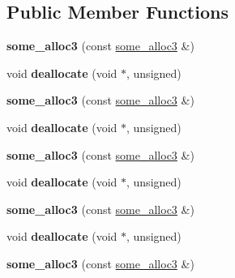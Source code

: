 \subsection*{Public Member Functions}
\begin{DoxyCompactItemize}
\item 
\mbox{\label{structsome__alloc3_ad7395261d1d33a5af7e39428dbc2ada4}} 
{\bfseries some\+\_\+alloc3} (const \mbox{\hyperlink{structsome__alloc3}{some\+\_\+alloc3}} \&)
\item 
\mbox{\label{structsome__alloc3_a3f290ec2c0726b083de71cfb848fc8e3}} 
void {\bfseries deallocate} (void $\ast$, unsigned)
\item 
\mbox{\label{structsome__alloc3_ad7395261d1d33a5af7e39428dbc2ada4}} 
{\bfseries some\+\_\+alloc3} (const \mbox{\hyperlink{structsome__alloc3}{some\+\_\+alloc3}} \&)
\item 
\mbox{\label{structsome__alloc3_a3f290ec2c0726b083de71cfb848fc8e3}} 
void {\bfseries deallocate} (void $\ast$, unsigned)
\item 
\mbox{\label{structsome__alloc3_ad7395261d1d33a5af7e39428dbc2ada4}} 
{\bfseries some\+\_\+alloc3} (const \mbox{\hyperlink{structsome__alloc3}{some\+\_\+alloc3}} \&)
\item 
\mbox{\label{structsome__alloc3_a3f290ec2c0726b083de71cfb848fc8e3}} 
void {\bfseries deallocate} (void $\ast$, unsigned)
\item 
\mbox{\label{structsome__alloc3_ad7395261d1d33a5af7e39428dbc2ada4}} 
{\bfseries some\+\_\+alloc3} (const \mbox{\hyperlink{structsome__alloc3}{some\+\_\+alloc3}} \&)
\item 
\mbox{\label{structsome__alloc3_a3f290ec2c0726b083de71cfb848fc8e3}} 
void {\bfseries deallocate} (void $\ast$, unsigned)
\item 
\mbox{\label{structsome__alloc3_ad7395261d1d33a5af7e39428dbc2ada4}} 
{\bfseries some\+\_\+alloc3} (const \mbox{\hyperlink{structsome__alloc3}{some\+\_\+alloc3}} \&)
\item 

\end{DoxyCompactItemize}
